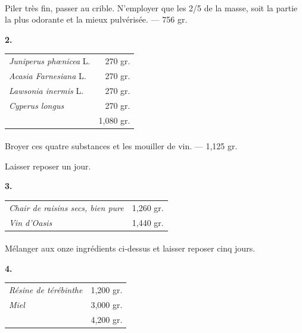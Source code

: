\documentclass[a4paper, 11pt, oneside, landscape]{article}
\begin{document}
\paragraph{}
Piler très fin, passer au crible. N'employer que les 2/5 de la masse, soit la partie la plus odorante et la mieux pulvérisée. --- 756 gr.
\begin{center}
\textbf{2.}
\end{center}
\begin{table}[H]
    \centering\bfseries
    \begin{tabular}{l r}
        \emph{Juniperus phœnicea} L.  &  270 gr. \\
        \emph{Acasia Farnesiana} L.  &  270 gr. \\
        \emph{Lawsonia inermis} L.  &  270 gr. \\
        \emph{Cyperus longus}  &  270 gr. \\ \hline
        ~ & 1,080 gr. \\
    \end{tabular}
\end{table}
\paragraph{}
Broyer ces quatre substances et les mouiller de vin. --- 1,125 gr.

Laisser reposer un jour.
\begin{center}
\textbf{3.}
\end{center}
\begin{table}[H]
    \centering\bfseries
    \begin{tabular}{l r}
        \emph{Chair de raisins secs, bien pure} & 1,260 gr. \\
        \emph{Vin d'Oasis} & 1,440 gr. \\
    \end{tabular}
\end{table}
\paragraph{}
Mélanger aux onze ingrédients ci-dessus et laisser reposer cinq jours.
\begin{center}
\textbf{4.}
\end{center}
\begin{table}[H]
    \centering\bfseries
    \begin{tabular}{l r}
        \emph{Résine de térébinthe} & 1,200 gr. \\
        \emph{Miel} & 3,000 gr. \\ \hline
        ~ & 4,200 gr. \\
    \end{tabular}
\end{table}
\end{document}
